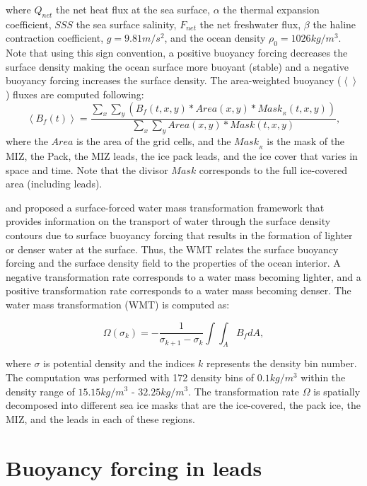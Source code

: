 \documentclass[draft]{agujournal2019}
\begin{document}
where $Q_{net}$ the net heat flux at the sea surface, $\alpha$ the thermal expansion coefficient, $SSS$ the sea surface salinity, $F_{net}$ the net freshwater flux, $\beta$ the haline contraction coefficient, $g = 9.81 m/s^2$, and the ocean density $\rho_0 = 1026 kg/m^3$. 
Note that using this sign convention, a positive buoyancy forcing decreases the surface density making the ocean surface more buoyant (stable) and a negative buoyancy forcing increases the surface density. The area-weighted buoyancy ($ \left<\right>$) fluxes are computed following:
\begin{equation}
    \left<B_f (t)\right>  = \frac{\sum_x \sum_y \left( B_f(t,x,y) * Area(x,y) * Mask_{_R}(t,x,y)\right)}{\sum_x \sum_y Area(x,y) * Mask(t,x,y)},
    \label{eq:eq3}
\end{equation}
where the $Area$ is the area of the grid cells, and the $Mask_{_R}$ is the mask of the MIZ, the Pack, the MIZ leads, the ice pack leads, and the ice cover that varies in space and time. Note that the divisor $Mask$ corresponds to the full ice-covered area (including leads).

 and  proposed a surface-forced water mass transformation framework that provides information on the transport of water through the surface density contours due to surface buoyancy forcing that results in the formation of lighter or denser water at the surface. Thus, the WMT relates the surface buoyancy forcing and the surface density field to the properties of the ocean interior. A negative transformation rate corresponds to a water mass becoming lighter, and a positive transformation rate corresponds to a water mass becoming denser. The water mass transformation (WMT) is computed as:

\begin{equation}
    \Omega(\sigma_k) = - \frac{1}{\sigma_{k+1}-\sigma_k}\int\int_AB_fdA,
    \label{eq:eq4}
\end{equation}

where $\sigma$ is potential density and the indices $k$ represents the density bin number. The computation was performed with 172 density bins of $0.1 kg/m^3$ within the density range of $15.15 kg/m^3$ - $32.25 kg/m^3$. The transformation rate $\Omega$ is spatially decomposed into different sea ice masks that are the ice-covered, the pack ice, the MIZ, and the leads in each of these regions. 

\section{Buoyancy forcing in leads}\label{sec2}
\end{document}
